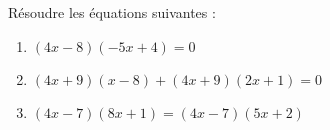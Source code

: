 \documentclass[a4paper,11pt,exos]{nsi} %
\begin{document}
\maketitle

\begin{exercice}
    Résoudre les équations suivantes :
        \begin{enumerate}
            \item $(4x-8)(-5x+4)=0$
            \item $(4x+9)( x-8)+(4x+9)(2x+1)=0$
            \item $(4x-7)(8x+1)=(4x-7)(5x+2)$
        \end{enumerate}
    
    \end{exercice}
\end{document}
